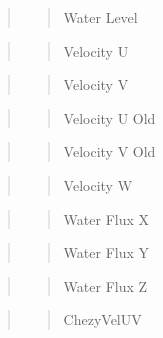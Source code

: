 \begin{quote}
\begin{quote}
Water Level \end{quote}
\end{quote}


\begin{quote}
\begin{quote}
Velocity U \end{quote}
\end{quote}


\begin{quote}
\begin{quote}
Velocity V \end{quote}
\end{quote}


\begin{quote}
\begin{quote}
Velocity U Old \end{quote}
\end{quote}


\begin{quote}
\begin{quote}
Velocity V Old \end{quote}
\end{quote}


\begin{quote}
\begin{quote}
Velocity W \end{quote}
\end{quote}


\begin{quote}
\begin{quote}
Water Flux X \end{quote}
\end{quote}


\begin{quote}
\begin{quote}
Water Flux Y \end{quote}
\end{quote}


\begin{quote}
\begin{quote}
Water Flux Z \end{quote}
\end{quote}


\begin{quote}
\begin{quote}
Chezy\+Vel\+UV \end{quote}
\end{quote}


